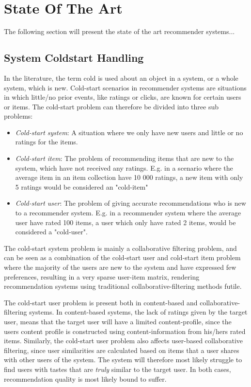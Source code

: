 
\section{State Of The Art}

The following section will present the state of the art recommender systems...

\subsection{System Coldstart Handling}


In the literature, the term cold is used about an object in a system, or a whole system, which is new. Cold-start scenarios in recommender systems are situations in which little/no prior events, like ratings or clicks, are known for certain users or items. The cold-start problem can therefore be divided into three sub problems:

\begin{itemize}
	\item \emph{Cold-start system}: A situation where we only have new users and little or no ratings for the items.
	\item \emph{Cold-start item}: The problem of recommending items that are new to the system, which have not received any ratings. E.g. in a scenario where the average item in an item collection have 10 000 ratings, a new item with only 5 ratings would be considered an "cold-item"
	\item \emph{Cold-start user}: The problem of giving accurate recommendations who is new to a recommender system. E.g. in a recommender system where the average user have rated 100 items, a user which only have rated 2 items, would be considered a "cold-user".
\end{itemize}

The cold-start system problem is mainly a collaborative filtering problem, and can be seen as a combination of the cold-start user and cold-start item problem where the majority of the users are new to the system and have expressed few preferences, resulting in a very sparse user-item matrix, rendering recommendation systems using traditional collaborative-filtering methods futile.

The cold-start user problem is present both in content-based and collaborative-filtering systems. In content-based systems, the lack of ratings given by the target user, means that the target user will have a limited content-profile, since the users content profile is constructed using content-information from his/hers rated items. Similarly, the cold-start user problem also affects user-based collaborative filtering, since user similarities are calculated based on items that a user shares with other users of the system. The system will therefore most likely struggle to find users with tastes that are \emph{truly} similar to the target user. In both cases, recommendation quality is most likely bound to suffer.

